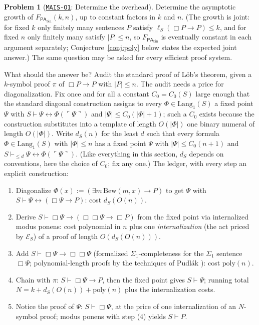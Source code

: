 \documentclass[11pt]{amsart}
\newcommand{\Oid}[1]{\href{https://github.com/lionellevine/MAIS/blob/main/open-problems/MAIS-O#1.md}{\texttt{MAIS-O#1}}}
\theoremstyle{plain}
\theoremstyle{definition}
\newtheorem{problem}[theorem]{Problem}
\newcommand{\PAbin}{\mathsf{PA}_{\mathrm{bin}}}
\newcommand{\Lang}{\mathrm{Lang}}
\newcommand{\gn}[1]{\ulcorner #1 \urcorner}
\begin{document}
\begin{problem}[\Oid{1}: Determine the overhead]
\label{prob:determineF}
Determine the asymptotic growth of $F_{\PAbin}(k,n)$, up to constant factors in $k$ and $n$. (The growth is joint: for fixed $k$ only finitely many sentences $P$ satisfy $\ell_S(\Box P \to P) \le k$, and for fixed $n$ only finitely many satisfy $|P| \le n$, so $F_{\PAbin}$ is eventually constant in each argument separately; Conjecture~\ref{conj:poly} below states the expected joint answer.) The same question may be asked for every efficient proof system.
\end{problem}

What should the answer be? Audit the standard proof of L\"ob's theorem, given a $k$-symbol proof $\pi$ of $\Box P \to P$ with $|P| \le n$. The audit needs a price for diagonalization. Fix once and for all a constant $C_0 = C_0(S)$ large enough that the standard diagonal construction assigns to every $\Phi \in \Lang_1(S)$ a fixed point $\Psi$ with $S \vdash \Psi \leftrightarrow \Phi(\gn{\Psi})$ and $|\Psi| \le C_0(|\Phi|+1)$; such a $C_0$ exists because the construction substitutes into a template of length $O(|\Phi|)$ one binary numeral of length $O(|\Phi|)$. Write $d_S(n)$ for the least $d$ such that every formula $\Phi \in \Lang_1(S)$ with $|\Phi| \le n$ has a fixed point $\Psi$ with $|\Psi| \le C_0(n+1)$ and $S \vdash_{\le d} \Psi \leftrightarrow \Phi(\gn{\Psi})$. (Like everything in this section, $d_S$ depends on conventions, here the choice of $C_0$; fix any one.) The ledger, with every step an explicit construction:
\begin{enumerate}
\item Diagonalize $\Phi(x) := (\exists m\,\mathrm{Bew}(m,x) \to P)$ to get $\Psi$ with $S \vdash \Psi \leftrightarrow (\Box\Psi \to P)$: cost $d_S(O(n))$.
\item Derive $S \vdash \Box\Psi \to (\Box\Box\Psi \to \Box P)$ from the fixed point via internalized modus ponens: cost polynomial in $n$ plus one \emph{internalization} (the act priced by $\mathcal{E}_S$) of a proof of length $O(d_S(O(n)))$.
\item Add $S \vdash \Box\Psi \to \Box\Box\Psi$ (formalized $\Sigma_1$-completeness for the $\Sigma_1$ sentence $\Box\Psi$; polynomial-length proofs by the techniques of Pudl\'ak \cite{pudlak1998}): cost $\mathrm{poly}(n)$.
\item Chain with $\pi$: $S \vdash \Box\Psi \to P$, then the fixed point gives $S \vdash \Psi$; running total $N = k + d_S(O(n)) + \mathrm{poly}(n)$ plus the internalization costs.
\item Notice the proof of $\Psi$: $S \vdash \Box\Psi$, at the price of one internalization of an $N$-symbol proof; modus ponens with step (4) yields $S \vdash P$.
\end{enumerate}
\end{document}
